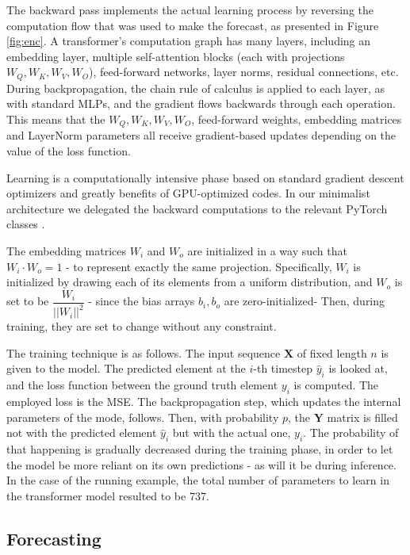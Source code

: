 \documentclass[algorithms,article,submit,pdftex,moreauthors]{Definitions/mdpi}
\begin{document}
The backward pass implements the actual learning process by reversing the computation flow that was used to make the forecast, as presented in Figure \ref{fig:enc}. A transformer's computation graph has many layers, including an embedding layer, multiple self-attention blocks (each with projections $W_Q, W_K, W_V, W_O$), feed-forward networks, layer norms, residual connections, etc. During backpropagation, the chain rule of calculus is applied to each layer, as with standard MLPs, and the gradient flows backwards through each operation. This means that the $W_Q, W_K, W_V, W_O$, feed-forward weights, embedding matrices and LayerNorm parameters all receive gradient-based updates depending on the value of the loss function.

Learning is a computationally intensive phase based on standard gradient descent optimizers and greatly benefits of GPU-optimized codes. In our minimalist architecture we delegated the backward computations to the relevant PyTorch classes  \cite{PyTorch25}.

The embedding matrices $W_i$ and $W_o$ are initialized in a way such that $W_i \cdot W_o = 1$ - to represent exactly the same projection. Specifically, $W_i$ is initialized by drawing each of its elements from a uniform distribution, and $W_o$ is set to be $\dfrac{W_i}{||W_i||^2}$ - since the bias arrays $b_i, b_o$ are zero-initialized- Then, during training, they are set to change without any constraint.

The training technique is as follows. The input sequence $\textbf{X}$ of fixed length $n$ is given to the model. The predicted element at the $i$-th timestep $\hat y_i$ is looked at, and the loss function between the ground truth element $y_i$ is computed. The employed loss is the MSE. The backpropagation step, which updates the internal parameters of the mode, follows. Then, with probability $p$, the $\textbf{Y}$ matrix is filled not with the predicted element $\hat y_i$ but with the actual one, $y_i$. The probability of that happening is gradually decreased during the training phase, in order to let the model be more reliant on its own predictions - as will it be during inference. In the case of the running example, the total number of parameters to learn in the transformer model resulted to be 737. 


\subsection{Forecasting} \label{subsec:forecasting}
\end{document}
